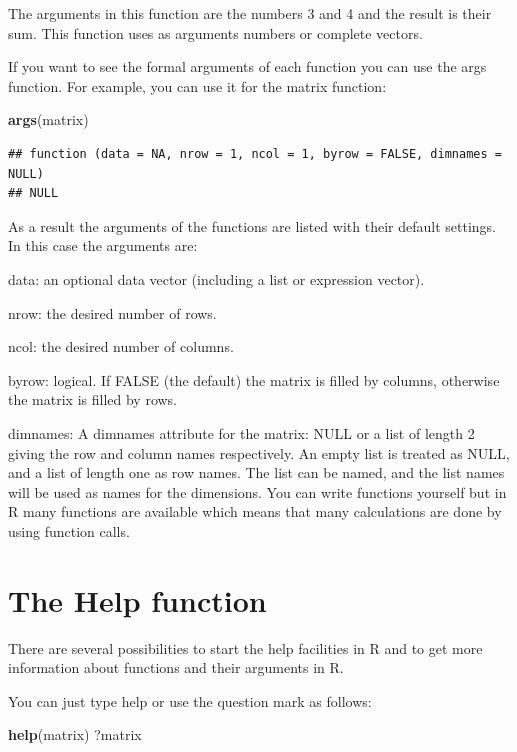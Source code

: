 \documentclass[
]{book}
\newenvironment{Shaded}{\begin{snugshade}}{\end{snugshade}}
\newcommand{\KeywordTok}[1]{\textcolor[rgb]{0.13,0.29,0.53}{\textbf{#1}}}
\newcommand{\NormalTok}[1]{#1}
\begin{document}
The arguments in this function are the numbers 3 and 4 and the result is their sum. This function uses as arguments numbers or complete vectors.

If you want to see the formal arguments of each function you can use the args function. For example, you can use it for the matrix function:

\begin{Shaded}
\begin{Highlighting}[]
\KeywordTok{args}\NormalTok{(matrix)}
\end{Highlighting}
\end{Shaded}

\begin{verbatim}
## function (data = NA, nrow = 1, ncol = 1, byrow = FALSE, dimnames = NULL) 
## NULL
\end{verbatim}

As a result the arguments of the functions are listed with their default settings. In this case the arguments are:

data: an optional data vector (including a list or expression vector).

nrow: the desired number of rows.

ncol: the desired number of columns.

byrow: logical. If FALSE (the default) the matrix is filled by columns, otherwise the matrix is filled by rows.

dimnames: A dimnames attribute for the matrix: NULL or a list of length 2 giving the row and column names respectively. An empty list is treated as NULL, and a list of length one as row names. The list can be named, and the list names will be used as names for the dimensions.
You can write functions yourself but in R many functions are available which means that many calculations are done by using function calls.

\hypertarget{the-help-function}{%
\section{The Help function}\label{the-help-function}}

There are several possibilities to start the help facilities in R and to get more information about functions and their arguments in R.

You can just type help or use the question mark as follows:

\begin{Shaded}
\begin{Highlighting}[]
\KeywordTok{help}\NormalTok{(matrix)}
\NormalTok{?matrix}
\end{Highlighting}
\end{Shaded}
\end{document}
